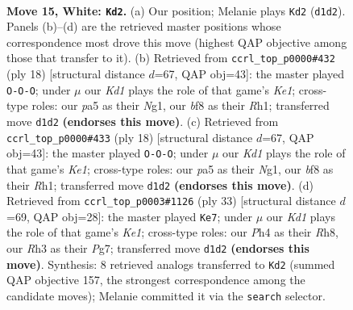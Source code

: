 \documentclass[11pt]{article}
\begin{document}
\clearpage

\begin{figure}[p]\centering
\begin{subfigure}{0.46\textwidth}\centering
\resizebox{\linewidth}{!}{%
\newchessgame
\chessboard[
  setfen={r3kbnr/2n3p1/6bp/p3pp2/2B4P/4B1NR/PP3PP1/R2K2N1 w kq - 0 15},
  showmover=false,
  pgfstyle=straightmove, color=movearrow, markmove={d1-d2}
]}
\caption{}
\end{subfigure}\hfill
\begin{subfigure}{0.46\textwidth}\centering
\resizebox{\linewidth}{!}{%
\newchessgame
\chessboard[
  setfen={r1b1k1nr/ppp1b1pp/3p4/8/2Bn1B2/2N5/PPP3PP/R3K1NR w KQkq - 0 10},
  showmover=false,
  pgfstyle=straightmove, color=movearrow, markmove={e1-c1}
]}
\caption{}
\end{subfigure}
\\[4pt]
\begin{subfigure}{0.46\textwidth}\centering
\resizebox{\linewidth}{!}{%
\newchessgame
\chessboard[
  setfen={r1b1k1nr/ppp1b1pp/3p4/8/2Bn1B2/2N5/PPP3PP/R3K1NR w KQkq - 0 10},
  showmover=false,
  pgfstyle=straightmove, color=movearrow, markmove={e1-c1}
]}
\caption{}
\end{subfigure}\hfill
\begin{subfigure}{0.46\textwidth}\centering
\resizebox{\linewidth}{!}{%
\newchessgame
\chessboard[
  setfen={2r1k2r/pp4pp/1nn2p2/4pb2/8/PPB1PB2/3N1PPP/R3K2R b KQk - 2 17},
  showmover=false,
  pgfstyle=straightmove, color=movearrow, markmove={e8-e7}
]}
\caption{}
\end{subfigure}
\caption{\textbf{Move 15, White: \texttt{Kd2}.} (a) Our position; Melanie plays \texttt{Kd2} (\texttt{d1d2}). Panels (b)--(d) are the retrieved master positions whose correspondence most drove this move (highest QAP objective among those that transfer to it). (b) Retrieved from \texttt{ccrl\_top\_p0000\#432} (ply 18) [structural distance $d$=67, QAP obj=43]: the master played \texttt{O-O-O}; under $\mu$ our \emph{Kd1} plays the role of that game's \emph{Ke1}; cross-type roles: our \emph{p}a5 as their \emph{N}g1, our \emph{b}f8 as their \emph{R}h1; transferred move \texttt{d1d2} \textbf{(endorses this move)}. (c) Retrieved from \texttt{ccrl\_top\_p0000\#433} (ply 18) [structural distance $d$=67, QAP obj=43]: the master played \texttt{O-O-O}; under $\mu$ our \emph{Kd1} plays the role of that game's \emph{Ke1}; cross-type roles: our \emph{p}a5 as their \emph{N}g1, our \emph{b}f8 as their \emph{R}h1; transferred move \texttt{d1d2} \textbf{(endorses this move)}. (d) Retrieved from \texttt{ccrl\_top\_p0003\#1126} (ply 33) [structural distance $d$=69, QAP obj=28]: the master played \texttt{Ke7}; under $\mu$ our \emph{Kd1} plays the role of that game's \emph{Ke1}; cross-type roles: our \emph{P}h4 as their \emph{R}h8, our \emph{R}h3 as their \emph{P}g7; transferred move \texttt{d1d2} \textbf{(endorses this move)}. Synthesis: 8 retrieved analogs transferred to \texttt{Kd2} (summed QAP objective 157, the strongest correspondence among the candidate moves); Melanie committed it via the \texttt{search} selector.}
\label{fig:thought-m28}
\end{figure}
\end{document}
